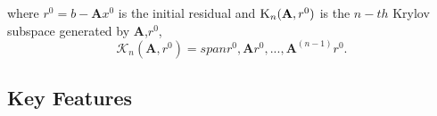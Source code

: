 \documentclass[12pt]{article}
\begin{document}
where $r^0=b-\textbf{A}x^0$ is the initial residual and $\textsc{K}_n(\textbf{A},r^0)$ is the $n-th$ Krylov subspace generated by \textbf{A},$r^0$,
\begin{equation}
    \mathcal{K}_n(\mathbf{A},r^0)=span{r^0,\mathbf{A}r^0,...,\mathbf{A}^(n-1)r^0}.
\end{equation}


\subsection{Key Features}



%
\end{document}
